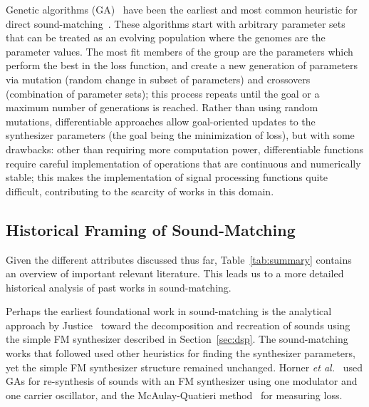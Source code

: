 \documentclass[lettersize,journal]{IEEEtran}
\providecommand{\gls}[1]{#1}
\begin{document}
Genetic algorithms (\gls{GA})~\cite{holland1992genetic} have been the earliest and most common heuristic for direct sound-matching~\cite{horner1993machine,mitchell2007evolutionary,yee2018automatic}. These algorithms start with arbitrary parameter sets that can be treated as an evolving population where the genomes are the parameter values. The most fit members of the group are the parameters which perform the best in the loss function, and create a new generation of parameters via mutation (random change in subset of parameters) and crossovers (combination of parameter sets); this process repeats until the goal or a maximum number of generations is reached. Rather than using random mutations, differentiable approaches allow goal-oriented updates to the synthesizer parameters (the goal being the minimization of loss), but with some drawbacks: other than requiring more computation power, differentiable functions require careful implementation of operations that are continuous and numerically stable; this makes the implementation of signal processing functions quite difficult, contributing to the scarcity of works in this domain.

\subsection{Historical Framing of Sound-Matching}
Given the different attributes discussed thus far, Table~\ref{tab:summary} contains an overview of important relevant literature. This leads us to a more detailed historical analysis of past works in sound-matching.

Perhaps the earliest foundational work in sound-matching is the analytical approach by Justice~\cite{justice1979analytic} toward the decomposition and recreation of sounds using the simple FM synthesizer described in Section~\ref{sec:dsp}. The sound-matching works that followed used other heuristics for finding the synthesizer parameters, yet the simple FM synthesizer structure remained unchanged. Horner \textit{et al.}~\cite{horner1993machine} used GAs for re-synthesis of sounds with an FM synthesizer using one modulator and one carrier oscillator, and the McAulay-Quatieri method~\cite{mcaulay1986speech} for measuring loss. 
\end{document}
